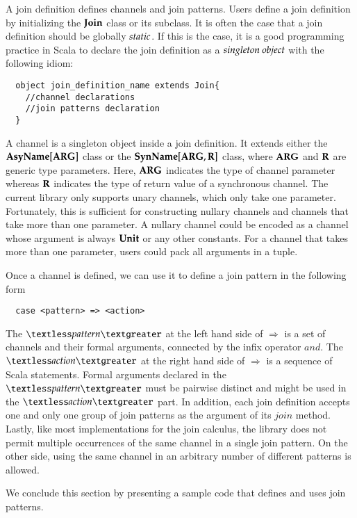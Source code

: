 A join definition defines channels and join patterns.  Users define a join definition by initializing the $\bf{Join}$ class or its subclass.  It is often the case that a join definition should be globally $\it{static}$.  If this is the case, it is a good programming practice in Scala to declare the join definition as a $\it{singleton\ object}$ with the following idiom:

\begin{lstlisting}
  object join_definition_name extends Join{
    //channel declarations
    //join patterns declaration
  }
\end{lstlisting}

A channel is a singleton object inside a join definition.  It extends either the $\bf{AsyName[ARG]}$ class or the $\bf{SynName[ARG,R]}$ class, where $\bf{ARG}$ and $\bf{R}$ are generic type parameters.  Here, $\bf{ARG}$ indicates the type of channel parameter whereas $\bf{R}$ indicates the type of return value of a synchronous channel.  The current library only supports unary channels, which only take one parameter.  Fortunately, this is sufficient for constructing nullary channels and channels that take more than one parameter.  A nullary channel could be encoded as a channel whose argument is always $\bf{Unit}$ or any other constants.  For a channel that takes more than one parameter, users could pack all arguments in a tuple.

Once a channel is defined, we can use it to define a join pattern in the following form
\begin{lstlisting}
  case <pattern> => <action>
\end{lstlisting}

The $\textless pattern \textgreater$ at the left hand side of $\Rightarrow$ is a set of channels and their formal arguments, connected by the infix operator $and$.  The  $\textless action \textgreater$ at the right hand side of $\Rightarrow$ is a sequence of Scala statements.  Formal arguments declared in the  $\textless pattern \textgreater$ must be pairwise distinct and might be used in the  $\textless action \textgreater$ part.  In addition, each join definition accepts one and only one group of join patterns as the argument of its $join$ method.  Lastly, like most implementations for the join calculus, the library does not permit multiple occurrences of the same channel in a single join pattern.  On the other side, using the same channel in an arbitrary number of different patterns is allowed.

We conclude this section by presenting a sample code that defines and uses join patterns.

